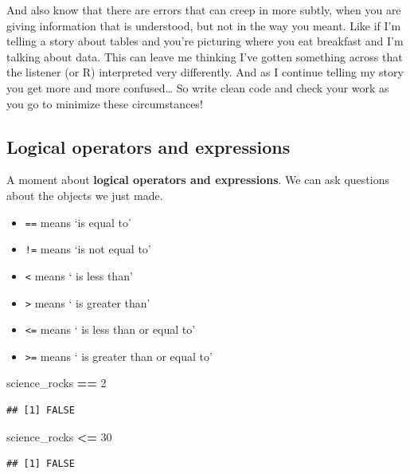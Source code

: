 \documentclass[]{book}
\newenvironment{Shaded}{\begin{snugshade}}{\end{snugshade}}
\newcommand{\DecValTok}[1]{\textcolor[rgb]{0.00,0.00,0.81}{#1}}
\newcommand{\StringTok}[1]{\textcolor[rgb]{0.31,0.60,0.02}{#1}}
\newcommand{\OperatorTok}[1]{\textcolor[rgb]{0.81,0.36,0.00}{\textbf{#1}}}
\newcommand{\NormalTok}[1]{#1}
\providecommand{\tightlist}{%
  \setlength{\itemsep}{0pt}\setlength{\parskip}{0pt}}
\theoremstyle{definition}
\theoremstyle{definition}
\theoremstyle{definition}
\theoremstyle{remark}
\begin{document}
And also know that there are errors that can creep in more subtly, when
you are giving information that is understood, but not in the way you
meant. Like if I'm telling a story about tables and you're picturing
where you eat breakfast and I'm talking about data. This can leave me
thinking I've gotten something across that the listener (or R)
interpreted very differently. And as I continue telling my story you get
more and more confused\ldots{} So write clean code and check your work
as you go to minimize these circumstances!

\subsection{Logical operators and
expressions}\label{logical-operators-and-expressions}

A moment about \textbf{logical operators and expressions}. We can ask
questions about the objects we just made.

\begin{itemize}
\tightlist
\item
  \texttt{==} means `is equal to'
\item
  \texttt{!=} means `is not equal to'
\item
  \texttt{\textless{}} means ` is less than'
\item
  \texttt{\textgreater{}} means ` is greater than'
\item
  \texttt{\textless{}=} means ` is less than or equal to'
\item
  \texttt{\textgreater{}=} means ` is greater than or equal to'
\end{itemize}

\begin{Shaded}
\begin{Highlighting}[]
\NormalTok{science_rocks }\OperatorTok{==}\StringTok{ }\DecValTok{2}
\end{Highlighting}
\end{Shaded}

\begin{verbatim}
## [1] FALSE
\end{verbatim}

\begin{Shaded}
\begin{Highlighting}[]
\NormalTok{science_rocks }\OperatorTok{<=}\StringTok{ }\DecValTok{30}
\end{Highlighting}
\end{Shaded}

\begin{verbatim}
## [1] FALSE
\end{verbatim}
\end{document}
